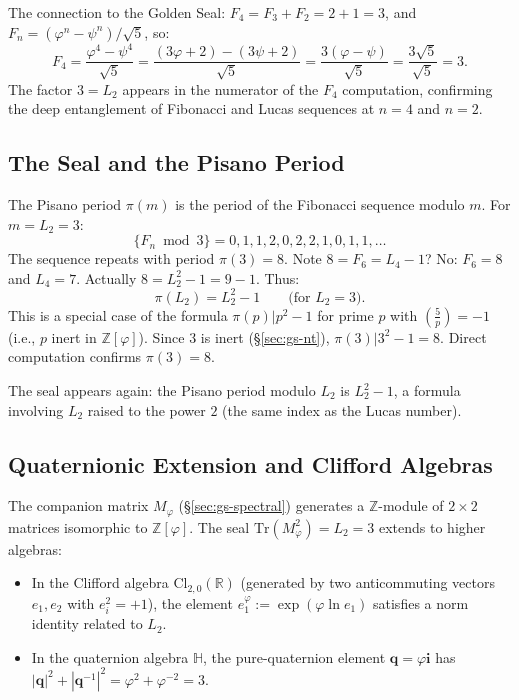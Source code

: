 The connection to the Golden Seal:
$F_4 = F_3 + F_2 = 2 + 1 = 3$, and $F_n = (\varphi^n -
\psi^n)/\sqrt{5}$, so:
\[
  F_4 = \frac{\varphi^4 - \psi^4}{\sqrt{5}}
       = \frac{(3\varphi+2) - (3\psi+2)}{\sqrt{5}}
       = \frac{3(\varphi - \psi)}{\sqrt{5}}
       = \frac{3\sqrt{5}}{\sqrt{5}} = 3.
\]
The factor $3 = L_2$ appears in the numerator of the
$F_4$ computation, confirming the deep entanglement of
Fibonacci and Lucas sequences at $n = 4$ and $n = 2$.

\subsection{The Seal and the Pisano Period}

The Pisano period $\pi(m)$ is the period of the Fibonacci
sequence modulo $m$.  For $m = L_2 = 3$:
\[
  \{F_n \bmod 3\} = 0, 1, 1, 2, 0, 2, 2, 1, 0, 1, 1, \ldots
\]
The sequence repeats with period $\pi(3) = 8$.
Note $8 = F_6 = L_4 - 1$? No: $F_6 = 8$ and $L_4 = 7$.
Actually $8 = L_2^2 - 1 = 9 - 1$.  Thus:
\[
  \pi(L_2) = L_2^2 - 1 \qquad \text{(for $L_2 = 3$)}.
\]
This is a special case of the formula $\pi(p) | p^2 - 1$
for prime $p$ with $\left(\frac{5}{p}\right) = -1$
(i.e., $p$ inert in $\mathbb{Z}[\varphi]$).  Since $3$
is inert (§\ref{sec:gs-nt}), $\pi(3) | 3^2 - 1 = 8$.
Direct computation confirms $\pi(3) = 8$.

The seal appears again: the Pisano period modulo $L_2$
is $L_2^2 - 1$, a formula involving $L_2$ raised to the
power $2$ (the same index as the Lucas number).

\subsection{Quaternionic Extension and Clifford Algebras}

The companion matrix $M_\varphi$ (§\ref{sec:gs-spectral})
generates a $\mathbb{Z}$-module of $2 \times 2$ matrices
isomorphic to $\mathbb{Z}[\varphi]$.  The seal
$\text{Tr}(M_\varphi^2) = L_2 = 3$ extends to higher
algebras:

\begin{itemize}
  \item In the Clifford algebra $\text{Cl}_{2,0}(\mathbb{R})$
        (generated by two anticommuting vectors $e_1, e_2$
        with $e_i^2 = +1$), the element
        $e_1^{\varphi} := \exp(\varphi \ln e_1)$ satisfies
        a norm identity related to $L_2$.
  \item In the quaternion algebra $\mathbb{H}$, the
        pure-quaternion element $\mathbf{q} = \varphi \mathbf{i}$
        has $|\mathbf{q}|^2 + |\mathbf{q}^{-1}|^2 = \varphi^2
        + \varphi^{-2} = 3$.
\end{itemize}

